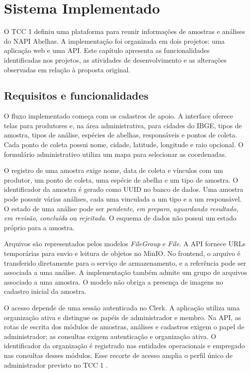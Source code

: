 \chapter{Sistema Implementado}
\label{chap:sistema_implementado}

O TCC 1 definiu uma plataforma para reunir informações de amostras e análises do NAPI Abelhas. A implementação foi organizada em dois projetos: uma aplicação web e uma API. Este capítulo apresenta as funcionalidades identificadas nos projetos, as atividades de desenvolvimento e as alterações observadas em relação à proposta original.

\section{Requisitos e funcionalidades}
\label{sec:requisitos}

O fluxo implementado começa com os cadastros de apoio. A interface oferece telas para produtores e, na área administrativa, para cidades do IBGE, tipos de amostra, tipos de análise, espécies de abelhas, responsáveis e pontos de coleta. Cada ponto de coleta possui nome, cidade, latitude, longitude e raio opcional. O formulário administrativo utiliza um mapa para selecionar as coordenadas.

O registro de uma amostra exige nome, data de coleta e vínculos com um produtor, um ponto de coleta, uma espécie de abelha e um tipo de amostra. O identificador da amostra é gerado como UUID no banco de dados. Uma amostra pode possuir várias análises, cada uma vinculada a um tipo e a um responsável. O estado de uma análise pode ser \textit{pendente}, \textit{em preparo}, \textit{aguardando resultado}, \textit{em revisão}, \textit{concluída} ou \textit{rejeitada}. O esquema de dados não possui um estado próprio para a amostra.

Arquivos são representados pelos modelos \textit{FileGroup} e \textit{File}. A API fornece URLs temporárias para envio e leitura de objetos no MinIO. No frontend, o arquivo é transferido diretamente para o serviço de armazenamento, e a referência pode ser associada a uma análise. A implementação também admite um grupo de arquivos associado a uma amostra. O modelo não obriga a presença de imagens no cadastro inicial da amostra.

O acesso depende de uma sessão autenticada no Clerk. A aplicação utiliza uma organização ativa e distingue os papéis de administrador e membro. Na API, as rotas de escrita dos módulos de amostras, análises e cadastros exigem o papel de administrador; as consultas exigem autenticação e organização ativa. O identificador da organização é registrado nas entidades operacionais e empregado nas consultas desses módulos. Esse recorte de acesso amplia o perfil único de administrador previsto no TCC 1 \cite{clerk2026}.

